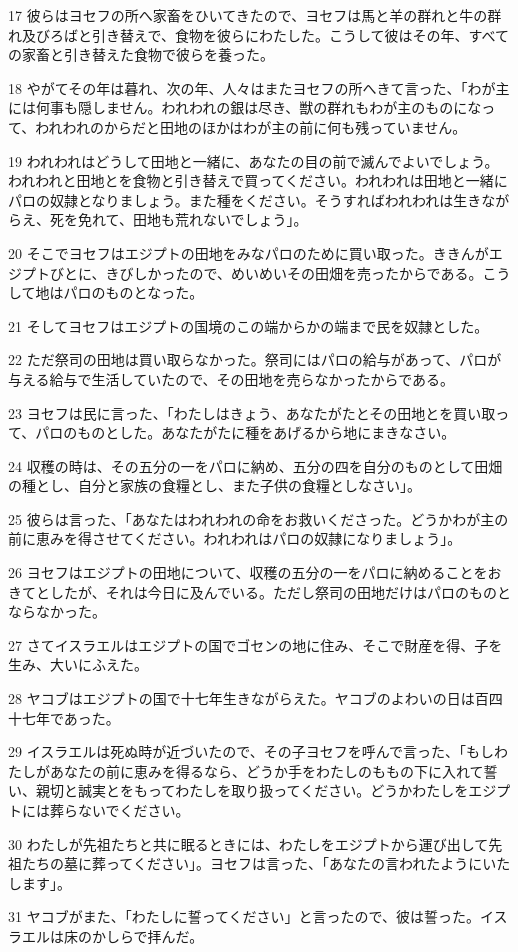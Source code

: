 \par 17 彼らはヨセフの所へ家畜をひいてきたので、ヨセフは馬と羊の群れと牛の群れ及びろばと引き替えで、食物を彼らにわたした。こうして彼はその年、すべての家畜と引き替えた食物で彼らを養った。
\par 18 やがてその年は暮れ、次の年、人々はまたヨセフの所へきて言った、「わが主には何事も隠しません。われわれの銀は尽き、獣の群れもわが主のものになって、われわれのからだと田地のほかはわが主の前に何も残っていません。
\par 19 われわれはどうして田地と一緒に、あなたの目の前で滅んでよいでしょう。われわれと田地とを食物と引き替えで買ってください。われわれは田地と一緒にパロの奴隷となりましょう。また種をください。そうすればわれわれは生きながらえ、死を免れて、田地も荒れないでしょう」。
\par 20 そこでヨセフはエジプトの田地をみなパロのために買い取った。ききんがエジプトびとに、きびしかったので、めいめいその田畑を売ったからである。こうして地はパロのものとなった。
\par 21 そしてヨセフはエジプトの国境のこの端からかの端まで民を奴隷とした。
\par 22 ただ祭司の田地は買い取らなかった。祭司にはパロの給与があって、パロが与える給与で生活していたので、その田地を売らなかったからである。
\par 23 ヨセフは民に言った、「わたしはきょう、あなたがたとその田地とを買い取って、パロのものとした。あなたがたに種をあげるから地にまきなさい。
\par 24 収穫の時は、その五分の一をパロに納め、五分の四を自分のものとして田畑の種とし、自分と家族の食糧とし、また子供の食糧としなさい」。
\par 25 彼らは言った、「あなたはわれわれの命をお救いくださった。どうかわが主の前に恵みを得させてください。われわれはパロの奴隷になりましょう」。
\par 26 ヨセフはエジプトの田地について、収穫の五分の一をパロに納めることをおきてとしたが、それは今日に及んでいる。ただし祭司の田地だけはパロのものとならなかった。
\par 27 さてイスラエルはエジプトの国でゴセンの地に住み、そこで財産を得、子を生み、大いにふえた。
\par 28 ヤコブはエジプトの国で十七年生きながらえた。ヤコブのよわいの日は百四十七年であった。
\par 29 イスラエルは死ぬ時が近づいたので、その子ヨセフを呼んで言った、「もしわたしがあなたの前に恵みを得るなら、どうか手をわたしのももの下に入れて誓い、親切と誠実とをもってわたしを取り扱ってください。どうかわたしをエジプトには葬らないでください。
\par 30 わたしが先祖たちと共に眠るときには、わたしをエジプトから運び出して先祖たちの墓に葬ってください」。ヨセフは言った、「あなたの言われたようにいたします」。
\par 31 ヤコブがまた、「わたしに誓ってください」と言ったので、彼は誓った。イスラエルは床のかしらで拝んだ。

